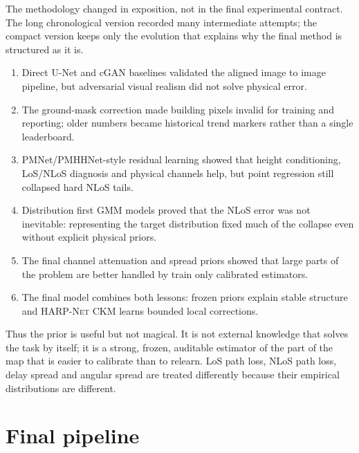 The methodology changed in exposition, not in the final experimental contract.
The long chronological version recorded many intermediate attempts; the
compact version keeps only the evolution that explains why the final method is
structured as it is.

\begin{enumerate}
\setlength\itemsep{0.15em}
\item Direct U-Net and cGAN baselines validated the aligned image to image
pipeline, but adversarial visual realism did not solve physical error.
\item The ground-mask correction made building pixels invalid for training and
reporting; older numbers became historical trend markers rather than a single
leaderboard.
\item PMNet/PMHHNet-style residual learning showed that height conditioning,
LoS/NLoS diagnosis and physical channels help, but point regression still
collapsed hard NLoS tails.
\item Distribution first GMM models proved that the NLoS error was not
inevitable: representing the target distribution fixed much of the collapse
even without explicit physical priors.
\item The final channel attenuation and spread priors showed that large parts of the
problem are better handled by train only calibrated estimators.
\item The final model combines both lessons: frozen priors explain stable
structure and \textsc{HARP-Net CKM} learns bounded local corrections.
\end{enumerate}

Thus the prior is useful but not magical. It is not external knowledge that
solves the task by itself; it is a strong, frozen, auditable estimator of the
part of the map that is easier to calibrate than to relearn. LoS path loss,
NLoS path loss, delay spread and angular spread are treated differently because
their empirical distributions are different.

\section{Final pipeline}
\label{sec:priors_overview}

